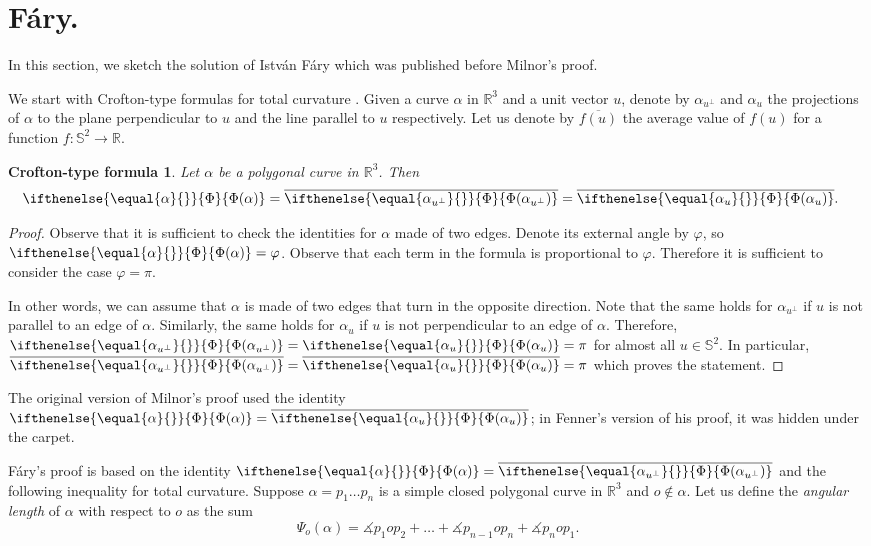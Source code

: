 \documentclass{article}
\theoremstyle{theorem}
\newtheorem{Crofton-type formula}[theorem]{Crofton-type formula}
\newtheorem{Douglas--Rado theorem}[theorem]{Douglas--Rado theorem}
\newtheorem{Extended monotonicity theorem}[theorem]{Extended monotonicity theorem}
\theoremstyle{definition}
\newcommand*{\tc}[1]{\ifthenelse{\equal{#1}{}}{\Phi}{\Phi({#1})}}%
\def\phi{\varphi}
\begin{document}
\section{Fáry.}\label{sec:fary}

In this section, we sketch the solution of István Fáry \cite{fary} which was published before Milnor's proof.

We start with Crofton-type formulas for total curvature \cite[Proposition 4.1]{sullivan-curves}.
Given a curve $\alpha$ in $\mathbb{R}^3$ and a unit vector $u$, denote by $\alpha_{u^\perp}$ 
and $\alpha_u$ the projections of $\alpha$ to the plane perpendicular to $u$ and the line parallel to $u$ respectively.
Let us denote by $\overline{f(u)}$ the average value of $f(u)$ for a function $f\colon\mathbb{S}^2\to\mathbb{R}$.

\begin{Crofton-type formula}\label{prop:tc-crofton}
Let $\alpha$ be a polygonal curve in $\mathbb{R}^3$.
Then
\begin{align*}
\tc\alpha
&=\overline{\tc{\alpha_{u^\perp}}}
=\overline{\tc{\alpha_u}}.
\end{align*}
\end{Crofton-type formula}


\begin{proof}
Observe that it is sufficient to check the identities for $\alpha$ made of two edges.
Denote its external angle by $\phi$, so $\tc\alpha=\phi$.
Observe that each term in the formula is proportional to $\phi$.
Therefore it is sufficient to consider the case $\phi=\pi$.

In other words, we can assume that $\alpha$ is made of two edges that turn in the opposite direction.
Note that the same holds for $\alpha_{u^\perp}$ if $u$ is not parallel to an edge of $\alpha$.
Similarly, the same holds for $\alpha_u$ if $u$ is not perpendicular to an edge of $\alpha$.
Therefore, $\tc{\alpha_{u^\perp}}=\tc{\alpha_u}=\pi$ for almost all $u\in\mathbb{S}^2$.
In particular, $\overline{\tc{\alpha_{u^\perp}}}=\overline{\tc{\alpha_u}}=\pi$ which proves the statement.
\end{proof}

The original version of Milnor's proof 
used the identity $\tc\alpha=\overline{\tc{\alpha_u}}$;
in Fenner's version of his proof, it was hidden under the carpet.

Fáry's proof is based on the identity $\tc\alpha=\overline{\tc{\alpha_{u^\perp}}}$ and the following inequality for total curvature.
Suppose $\alpha=p_1\dots p_n$ is a simple closed polygonal curve in $\mathbb{R}^3$ and $o\notin\alpha$.
Let us define the \emph{angular length} of $\alpha$ with respect to $o$ as the sum
\[\Psi_o(\alpha)=\measuredangle p_{1} o p_{2}+\dots+\measuredangle p_{n-1} o p_{n}+\measuredangle p_{n} o p_{1}.\]
\end{document}
